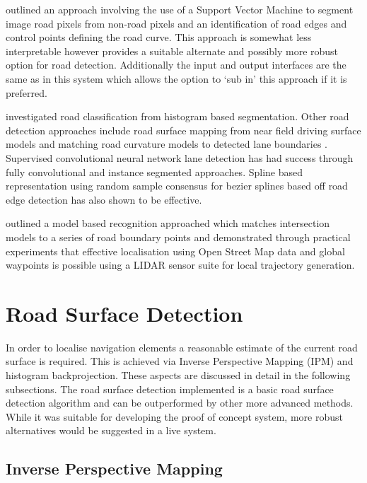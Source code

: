 \documentclass[]{aiaa-tc}%
\begin{document}
\citet{moncularLaneDetectAndTrack} outlined an approach involving the use of a Support Vector Machine to segment image road pixels from non-road pixels and an identification of road edges and control points defining the road curve. This approach is somewhat less interpretable however provides a suitable alternate and possibly more robust option for road detection. Additionally the input and output interfaces are the same as in this system which allows the option to `sub in' this approach if it is preferred. 

\citet{histogramSegmentationRoadClassification} investigated road classification from histogram based segmentation. Other road detection approaches include road surface mapping from near field driving surface models \citep{darpaChallengeRoadDetection} and matching road curvature models to detected lane boundaries \citep{intersectionDetectionSingleCamera}. Supervised convolutional neural network lane detection has had success through fully convolutional \citep{cnnLanes1} and instance segmented \citep{cnnLanes2} approaches. Spline based representation using random sample consensus for bezier splines based off road edge detection \citep{ransicBezierFit} has also shown to be effective.

\citet{modelBasedIntersection} outlined a model based recognition approached which matches intersection models to a series of road boundary points and \citet{mitLocalNavDriving} demonstrated through practical experiments that effective localisation using Open Street Map data and global waypoints is possible using a LIDAR sensor suite for local trajectory generation.




\section{Road Surface Detection}\label{s:roadSurfaceDetection}

In order to localise navigation elements a reasonable estimate of the current road surface is required. This is achieved via Inverse Perspective Mapping (IPM) and histogram backprojection. These aspects are discussed in detail in the following subsections. The road surface detection implemented is a basic road surface detection algorithm and can be outperformed by other more advanced methods. While it was suitable for developing the proof of concept system, more robust alternatives would be suggested in a live system.

\subsection{Inverse Perspective Mapping}\label{s:ipm}
\end{document}
